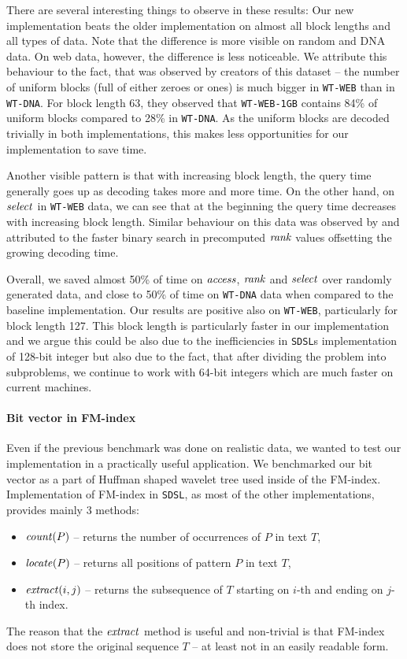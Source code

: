 There are several interesting things to observe in these results: Our new implementation
beats the older implementation on almost all block lengths and all types of data. Note that the difference is more
visible on random and DNA data. On web data, however, the difference is less noticeable. We attribute
this behaviour to the fact, that was observed by creators of this dataset -- the number of
uniform blocks (full of either zeroes or ones) is much bigger in \texttt{WT-WEB} than in \texttt{WT-DNA}.
For block length 63, they observed that \texttt{WT-WEB-1GB} contains 84\% of uniform blocks compared to 28\% in
\texttt{WT-DNA}. As the uniform blocks are decoded trivially in both implementations, this makes less opportunities
for our implementation to save time.

Another visible pattern is that with increasing block length, the query time generally goes up as decoding takes
more and more time. On the other hand, on $\mathit{select}$ in \texttt{WT-WEB} data, we can see that at the beginning
the query time decreases with increasing block length. Similar behaviour on this data was observed by
\cite{gog2014optimized} and attributed to the faster binary search in precomputed $\mathit{rank}$ values offsetting the
growing decoding time.

Overall, we saved almost 50\% of time on $\mathit{access}$, $\mathit{rank}$ and $\mathit{select}$ over randomly generated data,
and close to 50\% of time on \texttt{WT-DNA} data when compared to the baseline implementation. Our results
are positive also on \texttt{WT-WEB}, particularly for block length 127. This block length is particularly
faster in our implementation and we argue this could be also due to the inefficiencies in \texttt{SDSL}s
implementation of 128-bit integer but also due to the fact, that after dividing the problem into subproblems,
we continue to work with 64-bit integers which are much faster on current machines.

\paragraph{Bit vector in FM-index}

Even if the previous benchmark was done on realistic data, we wanted to test our implementation in
a practically useful application. We benchmarked our bit vector as a part of Huffman shaped
wavelet tree used inside of the FM-index. Implementation of FM-index in \texttt{SDSL}, as most
of the other implementations, provides mainly 3 methods:
\begin{itemize}
	\item $\mathit{count}(P)$ -- returns the number of occurrences of $P$ in text $T$,
	\item $\mathit{locate}(P)$ -- returns all positions of pattern $P$ in text $T$,
	\item $\mathit{extract}(i, j)$ -- returns the subsequence of $T$ starting on $i$-th and ending on $j$-th index.
\end{itemize}
The reason that the $\mathit{extract}$ method is useful and non-trivial is that FM-index
does not store the original sequence $T$ -- at least not in an easily readable form.

